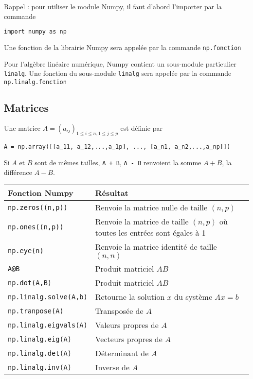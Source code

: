 \documentclass[11pt,a4paper]{article}
\begin{document}
Rappel : pour utiliser le module Numpy, il faut d'abord l'importer par la commande 
\begin{verbatim}
import numpy as np
\end{verbatim}
Une fonction de la librairie Numpy sera appelée par la commande \verb|np.fonction|

Pour l’algèbre linéaire numérique, Numpy contient un sous-module particulier \verb|linalg|. 
Une fonction du sous-module \verb|linalg| sera appelée par la commande \verb|np.linalg.fonction|

\subsection{Matrices}

Une matrice $A = (a_{ij})_{1\leq i \leq n, 1 \leq j \leq p}$ est définie par 
\begin{verbatim}
A = np.array([[a_11, a_12,...,a_1p], ..., [a_n1, a_n2,...,a_np]])
\end{verbatim}

Si $A$ et $B$ sont de mêmes tailles, \verb|A + B|, \verb|A - B| renvoient la somme $A+B$, la différence $A-B$. 


\begin{tabular}{|l|l|}
\hline
Fonction Numpy & Résultat \\
\hline
\verb|np.zeros((n,p))| & Renvoie la matrice nulle de taille $(n,p)$ \\
\verb|np.ones((n,p))| & Renvoie la matrice de taille $(n,p)$ où toutes les entrées sont égales à 1 \\
\verb|np.eye(n)| & Renvoie la matrice identité de taille $(n,n)$ \\
\verb|A@B| & Produit matriciel $AB$ \\
\verb|np.dot(A,B)| & Produit matriciel $AB$ \\
\verb|np.linalg.solve(A,b)| & Retourne la solution $x$ du système $Ax=b$ \\
\verb|np.tranpose(A)| & Transposée de $A$ \\
\verb|np.linalg.eigvals(A)| & Valeurs propres de $A$ \\
\verb|np.linalg.eig(A)| & Vecteurs propres de $A$ \\
\verb|np.linalg.det(A)| & Déterminant de $A$ \\
\verb|np.linalg.inv(A)| & Inverse de $A$ \\
\hline
\end{tabular}
\end{document}
